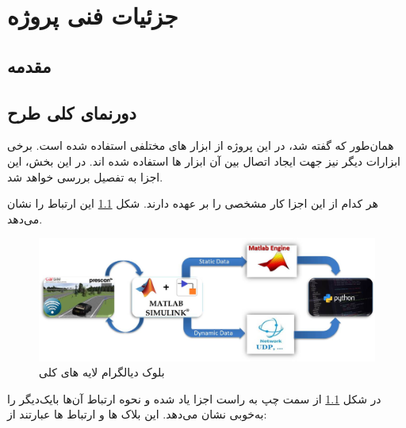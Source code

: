 \chapter{جزئیات فنی پروژه}


\section{مقدمه}
\section{دورنمای کلی طرح}
همان‌طور که گفته شد، در این پروژه از ابزار های مختلفی استفاده شده است. برخی ابزارات دیگر نیز جهت ایجاد اتصال بین آن ابزار ها استفاده شده اند. در این بخش، این اجزا به تفصیل بررسی خواهد شد.
 
 هر کدام از این اجزا کار مشخصی را بر عهده دارند.
 شکل  
\ref{fig:block-diagram}
این ارتباط را نشان می‌دهد.

\begin{figure}[h!]
	\centering
	\includegraphics[width=1\linewidth]{Figures/block-diagram-white}
	\caption{بلوک دیالگرام لایه های کلی}
	\label{fig:block-diagram}
\end{figure}

در شکل 
\ref{fig:block-diagram}
از سمت چپ به راست اجزا یاد شده و نحوه ارتباط آن‌ها با‌یک‌دیگر را به‌خوبی نشان می‌دهد. این بلاک ها و ارتباط ها عبارتند از:

